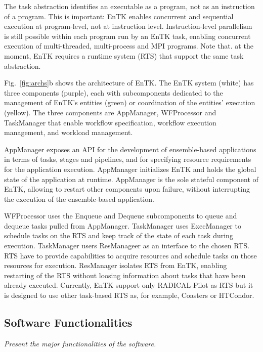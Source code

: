 \documentclass[preprint,12pt, a4paper]{elsarticle}
\begin{document}
The task abstraction identifies an executable as a program, not as an
instruction of a program. This is important: EnTK enables concurrent and
sequential execution at program-level, not at instruction level.
Instruction-level parallelism is still possible within each program run by an
EnTK task, enabling concurrent execution of multi-threaded, multi-process and
MPI programs. Note that. at the moment, EnTK requires a runtime system (RTS)
that support the same task abstraction.

Fig.~\ref{fig:archs}b shows the architecture of EnTK. The EnTK system (white)
has three components (purple), each with subcomponents dedicated to the
management of EnTK's entities (green) or coordination of the entities'
execution (yellow). The three components are AppManager, WFProcessor and
TaskManager that enable workflow specification, workflow execution
management, and workload management.

AppManager exposes an API for the development of ensemble-based applications
in terms of tasks, stages and pipelines, and for specifying resource
requirements for the application execution. AppManager initializes EnTK and
holds the global state of the application at runtime. AppManager is the sole
stateful component of EnTK, allowing to restart other components upon
failure, without interrupting the execution of the ensemble-based
application.

WFProcessor uses the Enqueue and Dequeue subcomponents to queue and dequeue
tasks pulled from AppManager. TaskManager uses ExecManager to schedule tasks
on the RTS and keep track of the state of each task during execution.
TaskManager users ResManageer as an interface to the chosen RTS. RTS have to
provide capabilities to acquire resources and schedule tasks on those
resources for execution. ResManager isolates RTS from EnTK, enabling
restarting of the RTS without loosing information about tasks that have been
already executed. Currently, EnTK support only RADICAL-Pilot as RTS but it is
designed to use other task-based RTS as, for example, Coasters or HTCondor.


\subsection{Software Functionalities}\label{ssec:functionalities}

{\em Present the major functionalities of the software.}
\end{document}
